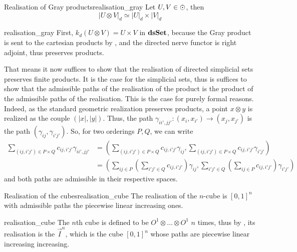 \begin{cprop}{Realisation of Gray products}{realisation_gray}
    Let \( U, V \in \eye \), then
    \begin{equation*}
        |U \otimes V|_d \simeq |U|_d \times |V|_d
    \end{equation*}
\end{cprop}
\begin{propproof}{realisation_gray}
    First, \( k_d(U \otimes V) = U \times V \) in \( \mathbf{dsSet} \), because the Gray product is sent to the cartesian products by , and the directed nerve functor is right adjoint, thus preserves products. 
    
    That means it now suffices to show that the realisation of directed simplicial sets preserves finite products. It is the case for the simplicial sets, thus is suffices to show that the admissible paths of the realisation of the product is the product of the admissible paths of the realisation. This is the case for purely formal reasons. Indeed, as the standard geometric realization preserves products, a point \( x\otimes y \) is realized as the couple \( (|x| ,|y|) \). Thus, the path \( \gamma_{ii', jj'} : (x_i, x_{i'}) \to (x_j, x_{j'}) \) is the path \( (\gamma_{ij}, \gamma_{i'j'}) \). So, for two orderings \( P, Q \), we can write
    \begin{align*}
        \sum\limits_{(ij, i'j') \in P \times Q} c_{ij, i'j'} \gamma_{ii', jj'} &= \left(\sum\limits_{(ij, i'j') \in P \times Q} c_{ij, i'j'} \gamma_{ij}, \sum\limits_{(ij, i'j') \in P \times Q} c_{ij, i'j'} \gamma_{i'j'}\right) \\
        &= \left(\sum\limits_{ij\in P} \left(\sum\limits_{i'j'\in Q} c_{ij, i'j'}\right) \gamma_{ij}, \sum\limits_{i'j'\in Q} \left(\sum\limits_{ij\in P} c_{ij, i'j'}\right) \gamma_{i'j'}\right)
    \end{align*}
    and both paths are admissible in their respective spaces. 
\end{propproof}
\begin{ccor}{Realisation of the cubes}{realisation_cube}
    The realisation of the \( n \)-cube is \( [0, 1]^n \) with admissible paths the piecewise linear increasing ones.
\end{ccor}
\begin{corproof}{realisation_cube}
    The \( n \)th cube is defined to be \( O^1 \otimes \dots \otimes O^1 \) \( n \) times, thus by , its realisation is the \( \vec{I}^n \), which is the cube \( [0, 1]^n \) whose paths are piecewise linear increasing increasing.  
\end{corproof}
